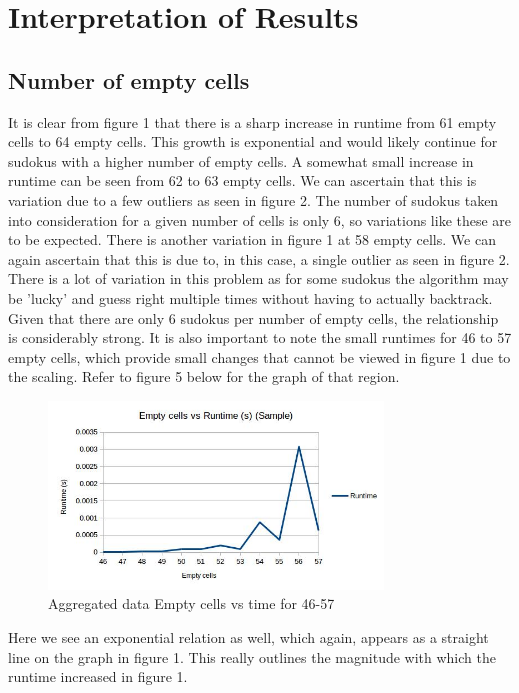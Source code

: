 \documentclass{article}
\begin{document}
\newpage

\section{Interpretation of Results}
\subsection{Number of empty cells}
It is clear from figure 1 that there is a sharp increase in runtime from 61 empty cells to 64 empty cells. This growth is exponential and would likely continue for sudokus with a higher number of empty cells. A somewhat small increase in runtime can be seen from 62 to 63 empty cells. We can ascertain that this is variation due to a few outliers as seen in figure 2. The number of sudokus taken into consideration for a given number of cells is only 6, so variations like these are to be expected. There is another variation in figure 1 at 58 empty cells. We can again ascertain that this is due to, in this case, a single outlier as seen in figure 2. There is a lot of variation in this problem as for some sudokus the algorithm may be 'lucky' and guess right multiple times without having to actually backtrack. Given that there are only 6 sudokus per number of empty cells, the relationship is considerably strong. It is also important to note the small runtimes for 46 to 57 empty cells, which provide small changes that cannot be viewed in figure 1 due to the scaling. Refer to figure 5 below for the graph of that region.

\begin{figure}[H]
	\includegraphics[width=0.9\linewidth, height=5cm]{graphs_outputs/EmptycellsVSTimeAggregated(Sample).jpg}
	\caption{Aggregated data Empty cells vs time for 46-57}
\end{figure}

Here we see an exponential relation as well, which again, appears as a straight line on the graph in figure 1. This really outlines the magnitude with which the runtime increased in figure 1.
\end{document}
